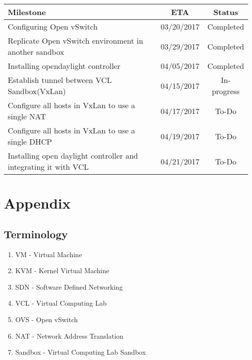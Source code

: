 \documentclass{article}
\begin{document}
\begin{center}
 \begin{tabular}{||l | c | c ||} 
 \hline
 Milestone & ETA & Status \\ [2ex] 
 \hline\hline
  Configuring Open vSwitch & 03/20/2017 & Completed  \\
\hline
  Replicate Open vSwitch environment in another sandbox & 03/29/2017 & Completed  \\
  
   \hline
  Installing opendaylight controller  & 04/05/2017 & Completed  \\ 
  \hline
  Establish tunnel between VCL Sandbox(VxLan) & 04/15/2017 & In-progress  \\ 
 
  \hline
  Configure all hosts in VxLan to use a single NAT & 04/17/2017 & To-Do  \\ 
  \hline
  Configure all hosts in VxLan to use a single DHCP & 04/19/2017 & To-Do  \\ 
  \hline
    Installing open daylight controller and integrating it with VCL & 04/21/2017 & To-Do  \\ 
 \hline
 \end{tabular}


\end{center}

\section{Appendix}
\subsection{Terminology}
\begin{enumerate}
    \item VM - Virtual Machine
    \item KVM - Kernel Virtual Machine
    \item SDN - Software Defined Networking
    \item VCL - Virtual Computing Lab
    \item OVS - Open vSwitch
    \item NAT - Network Address Translation
    \item Sandbox - Virtual Computing Lab Sandbox
\end{enumerate}



\end{document}
